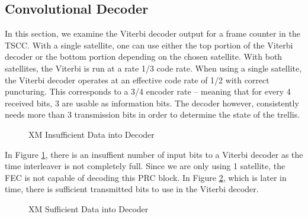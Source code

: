 \documentclass[conference,onecolumn]{IEEEtran}
\begin{document}


\subsection{Convolutional Decoder}

In this section, we examine the Viterbi decoder output for a frame counter in the TSCC. With a single satellite, one can use either the top portion of the Viterbi decoder or the bottom portion depending on the chosen satellite.  With both satellites, the Viterbi is run at a rate 1/3 code rate.  When using a single satellite, the Viterbi decoder operates at an effective code rate of 1/2 with correct puncturing. This corresponds to a 3/4 encoder rate -- meaning that for every 4 received bits, 3 are usable as information bits.  The decoder however, consistently needs more than 3 transmission bits in order to determine the state of the trellis.

\begin{figure}[H]
	\centerline{}
	\caption{XM Insufficient Data into Decoder}
	\label{fig::Viterbi_1}
\end{figure}

In Figure \ref{fig::Viterbi_1}, there is an insuffient number of input bits to a Viterbi decoder as the time interleaver is not completely full.  Since we are only using 1 satellite, the FEC is not capable of decoding this PRC block.  In Figure \ref{fig::Viterbi_2}, which is later in time, there is sufficient transmitted bits to use in the Viterbi decoder.

\begin{figure}[H]
	\centerline{}
	\caption{XM Sufficient Data into Decoder}
	\label{fig::Viterbi_2}
\end{figure}
\end{document}
